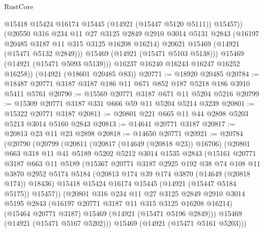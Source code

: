\begin{lexlean}{RustCore}
\begin{coremodule}
                @15418
                @15424
                @16174
                @15445
                (@14921 (@15447 @5120 @5111))
                @15457))
            (@20550
              @316
              @234
              @11
              @27
              @3125
              @2849
              @2910
              @3014
              @5131
              @2843
              (@16197 @20485 @3187 @11 @315 @3125 @16208 @16214)
              @20621
              @15469
              (@14921 (@15471 @5132 @2849)))
            @15469
            (@14921 (@15471 @5103 @5138)))
          @15469
          (@14921 (@15471 @5093 @5139)))
        @16237
        @16240
        @16243
        @16247
        @16252
        @16258))
    (@14921 (@18601 @20485 @83))
@20771 := @18920 @20485
@20784 := @18487 @20771 @3187 @3187 @186 @11 @671 @852 @187 @5218 @186 @3910 @5411 @5761
@20790 := @15569 @20771 @3187 @671 @11 @5204 @5216
@20799 := @15309 @20771 @3187 @331 @666 @59 @11 @5204 @5214 @3239
@20801 := @15322 @20771 @3187
@20811 := @20801 @221 @665 @11 @44 @2898 @5203 @5213 @3014 @5160 @2843
@20813 := @14641 @20771 @3187
@20817 := @20813 @23 @11 @23 @2898
@20818 := @14650 @20771
@20921 := @20784
    (@20790
      (@20799
        (@20811
          (@20817 (@14649 (@20818 @23)) @16706)
          (@20801
            @663
            @318
            @11
            @41
            @5189
            @5202
            @5212
            @3014
            @1535
            @2843
            (@15161
              @20771
              @3187
              @663
              @11
              @5189
              (@15367
                @20771
                @3187
                @2925
                @192
                @38
                @74
                @108
                @11
                @3870
                @2952
                @5174
                @5184
                (@20813 @174 @39 @174 @3870 (@14649 (@20818 @174)) @18436)
                @15418
                @15424
                @16174
                @15445
                (@14921 (@15447 @5184 @5175))
                @15457))
            (@20801
              @316
              @234
              @11
              @27
              @3125
              @2849
              @2910
              @3014
              @5195
              @2843
              (@16197 @20771 @3187 @11 @315 @3125 @16208 @16214)
              (@15464 @20771 @3187)
              @15469
              (@14921 (@15471 @5196 @2849)))
            @15469
            (@14921 (@15471 @5167 @5202)))
          @15469
          (@14921 (@15471 @5161 @5203)))

\end{coremodule}
\end{lexlean}
